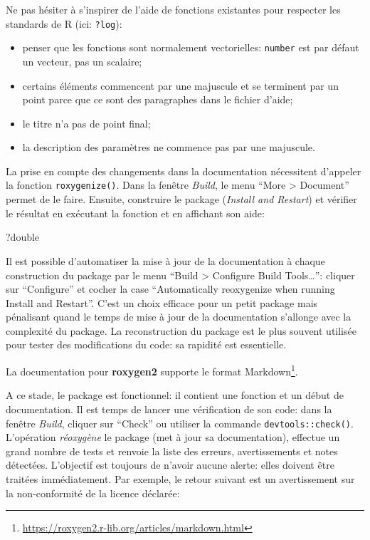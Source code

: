 \documentclass[
  12pt,
  french,
  a4paper,
  extrafontsizes,onecolumn,openright
  ]{memoir}
\newenvironment{Shaded}{\begin{snugshade}}{\end{snugshade}}
\newcommand{\NormalTok}[1]{#1}
\providecommand{\tightlist}{%
  \setlength{\itemsep}{0pt}\setlength{\parskip}{0pt}}
\begin{document}
\normalsize

Ne pas hésiter à s'inspirer de l'aide de fonctions existantes pour respecter les standards de R (ici: \texttt{?log}):

\begin{itemize}
\tightlist
\item
  penser que les fonctions sont normalement vectorielles: \texttt{number} est par défaut un vecteur, pas un scalaire;
\item
  certains éléments commencent par une majuscule et se terminent par un point parce que ce sont des paragraphes dans le fichier d'aide;
\item
  le titre n'a pas de point final;
\item
  la description des paramètres ne commence pas par une majuscule.
\end{itemize}

La prise en compte des changements dans la documentation nécessitent d'appeler la fonction \texttt{roxygenize()}.
Dans la fenêtre \emph{Build}, le menu \enquote{More \textgreater{} Document} permet de le faire.
Ensuite, construire le package (\emph{Install and Restart}) et vérifier le résultat en exécutant la fonction et en affichant son aide:

\scriptsize

\begin{Shaded}
\begin{Highlighting}[]
\NormalTok{?double}
\end{Highlighting}
\end{Shaded}

\normalsize

Il est possible d'automatiser la mise à jour de la documentation à chaque construction du package par le menu \enquote{Build \textgreater{} Configure Build Tools\ldots{}}: cliquer sur \enquote{Configure} et cocher la case \enquote{Automatically reoxygenize when running Install and Restart}.
C'est un choix efficace pour un petit package mais pénalisant quand le temps de mise à jour de la documentation s'allonge avec la complexité du package. La reconstruction du package est le plus souvent utilisée pour tester des modifications du code: sa rapidité est essentielle.

La documentation pour \textbf{roxygen2} supporte le format Markdown\footnote{\url{https://roxygen2.r-lib.org/articles/markdown.html}}.

A ce stade, le package est fonctionnel: il contient une fonction et un début de documentation.
Il est temps de lancer une vérification de son code: dans la fenêtre \emph{Build}, cliquer sur \enquote{Check} ou utiliser la commande \texttt{devtools::check()}.
L'opération \emph{réoxygène} le package (met à jour sa documentation), effectue un grand nombre de tests et renvoie la liste des erreurs, avertissements et notes détectées.
L'objectif est toujours de n'avoir aucune alerte: elles doivent être traitées immédiatement.
Par exemple, le retour suivant est un avertissement sur la non-conformité de la licence déclarée:
\end{document}
